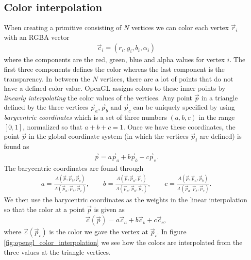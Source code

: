 \subsection{Color interpolation}
\label{sec:opengl_color_interpolation}
When creating a primitive consisting of $N$ vertices we can color each vertex $\vec r_i$ with an RGBA vector
\begin{align}
	\vec c_i = (r_i, g_i, b_i, \alpha_i)
\end{align}
where the components are the red, green, blue and alpha values for vertex $i$. The first three components defines the color whereas the last component is the transparency. In between the $N$ vertices, there are a lot of points that do not have a defined color value. OpenGL assigns colors to these inner points by \textit{linearly interpolating} the color values of the vertices. Any point $\vec p$ in a triangle defined by the three vertices $\vec p_a, \vec p_b$ and $\vec p_c$ can be uniquely specified by using \textit{barycentric coordinates} which is a set of three numbers $(a,b,c)$ in the range $[0,1]$, normalized so that $a+b+c=1$.  Once we have these coordinates, the point $\vec p$ in the global coordinate system (in which the vertices $\vec p_i$ are defined) is found as
\begin{align}
	\vec p = a\vec p_a + b\vec p_b + c\vec p_c.
\end{align}
The barycentric coordinates are found through
\begin{align}
	a = \frac{A(\vec p, \vec p_b, \vec p_c)}{A(\vec p_a, \vec p_b, \vec p_c)}, \qquad b = \frac{A(\vec p, \vec p_a, \vec p_c)}{A(\vec p_a, \vec p_b, \vec p_c)}, \qquad c = \frac{A(\vec p, \vec p_a, \vec p_b)}{A(\vec p_a, \vec p_b, \vec p_c)}.
\end{align}
We then use the barycentric coordinates as the weights in the linear interpolation so that the color at a point $\vec p$ is given as
\begin{align}
	\vec c(\vec p) = a\vec c_a + b\vec c_b + c\vec c_c,
\end{align}
where $\vec c(\vec p_i)$ is the color we gave the vertex at $\vec p_i$. In figure \ref{fig:opengl_color_interpolation} we see how the colors are interpolated from the three values at the triangle vertices.
